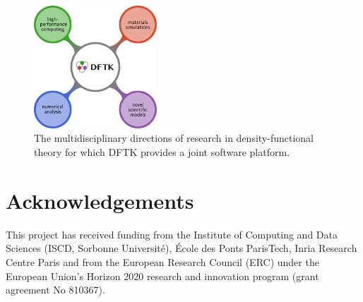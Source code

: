\documentclass{juliacon}
\begin{document}
\begin{figure}[t]
    \centerline{\includegraphics[width=4.6cm]{dftk.pdf}}
    \caption{The multidisciplinary
        directions of research in density-functional theory
        for which DFTK provides a joint software platform.}
    \label{fig:logodftk}
\end{figure}

\section{Acknowledgements} This project has received funding from the Institute of
Computing and Data Sciences (ISCD, Sorbonne Université), École des Ponts
ParisTech, Inria Research Centre Paris and from the European Research Council
(ERC) under the European Union's Horizon 2020 research and innovation program
(grant agreement No 810367).




\end{document}
